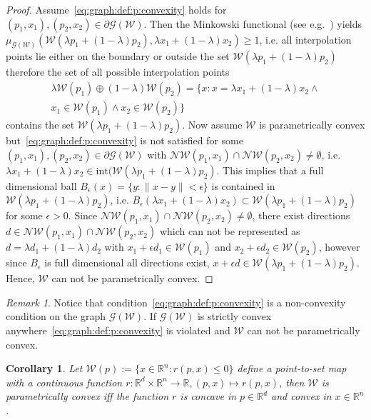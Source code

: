 \documentclass[journal]{IEEEtran}
\newcounter{thmcount}
\newtheorem{cor}[thmcount]{Corollary}
\theoremstyle{remark}
\newtheorem{rem}[thmcount]{Remark}
\theoremstyle{definition}
\begin{document}
%
\begin{proof}
%
Assume~\eqref{eq:graph:def:p:convexity} holds for $(p_1,x_1),(p_2,x_2)\in\partial\mathscr G(\mathcal W)$.
%
Then the Minkowski functional (see e.g.~\cite{Rudin:91}) yields $\mu_{\mathscr G(\mathcal W)}(\mathcal W(\lambda p_1 + (1-\lambda)p_2),
\lambda x_1+(1-\lambda)x_2)\geq1$,
i.e. all interpolation points lie either on the boundary or outside the set $\mathcal W(\lambda p_1+(1-\lambda)p_2)$
therefore the set of all possible interpolation points 
%
\[
\begin{split}
  \lambda \mathcal W(p_1)\oplus (1-\lambda)\mathcal W(p_2) = \{x:x=\lambda x_1 + (1-\lambda) x_2 \wedge\\ x_1\in\mathcal 
  W(p_1) \wedge x_2\in\mathcal W(p_2)\}
\end{split}
\]
%
contains the set $\mathcal W(\lambda p_1 + (1-\lambda)p_2)$.
%
Now assume $\mathcal W$ is parametrically convex but~\eqref{eq:graph:def:p:convexity} is not satisfied for 
some $(p_1,x_1),(p_2,x_2)\in\partial\mathscr G(\mathcal W)$ with $\mathcal N\mathcal W(p_1,x_1)\cap\mathcal 
N\mathcal W(p_2,x_2)\neq\emptyset$, i.e. $\lambda x_1 + (1-\lambda)x_2\in\text{int}(\mathcal W(\lambda p_1 + 
(1-\lambda)p_2)$.
%
This implies that a full dimensional ball $B_\epsilon(x ) = \{y:\| 
x-y\|<\epsilon\}$
is contained in $\mathcal W(\lambda p_1 + (1-\lambda)p_2)$, i.e. $B_\epsilon(\lambda x_1 + (1-\lambda)x_2 )\subset
\mathcal W(\lambda p_1 + (1-\lambda)p_2)$ for some $\epsilon>0$.
%
Since $\mathcal N\mathcal W(p_1,x_1)\cap\mathcal N\mathcal W(p_2,x_2)\neq\emptyset$, there exist directions 
$d\in\mathcal N\mathcal W(p_1,x_1)\cap\mathcal N\mathcal W(p_2,x_2)$ which can not be represented as $d=\lambda d_1+
(1-\lambda)d_2$ with $x_1 + \epsilon d_1\in\mathcal W(p_1)$ and $x_2  + \epsilon d_2\in\mathcal W(p_2)$, however since $B_\epsilon$ is full dimensional
all directions exist, $x+\epsilon d\in\mathcal W(\lambda p_1 + (1-\lambda)p_2)$.
%
Hence, $\mathcal W$ can not be parametrically convex.
\end{proof}
%
\begin{rem}
Notice that condition~\eqref{eq:graph:def:p:convexity} is a non-convexity condition on the graph $\mathscr G(\mathcal W)$.
%
If $\mathscr G(\mathcal W)$ is strictly convex anywhere~\eqref{eq:graph:def:p:convexity} is violated and 
$\mathcal W$ can not be parametrically convex.
\end{rem}
%
\begin{cor}
%
Let $\mathcal W(p):=\{x\in\mathbb R^n: r(p,x)\leq0\}$ define a point-to-set
map with a continuous function 
$r: \mathbb R^d \times\mathbb R^n \rightarrow \mathbb R,(p,x)\mapsto r(p,x)$, 
then $\mathcal W$ is parametrically
convex iff the function $r$ is concave in $p\in\mathbb R^d$ and convex in $x\in
\mathbb R^n$.
%
\end{cor}
\end{document}
